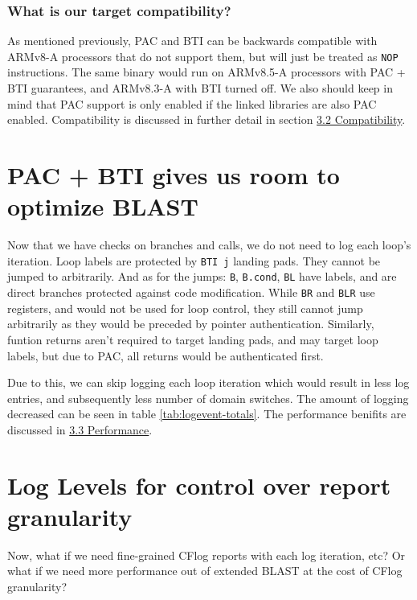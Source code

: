 \documentclass[a4paper, nobind]{templates/ociamthesis}
\begin{document}
\subsubsection{What is our target compatibility?}\label{what-is-our-target-compatibility}

As mentioned previously, PAC and BTI can be backwards compatible with ARMv8-A processors
that do not support them, but will just be treated as \texttt{NOP} instructions.
The same binary would run on ARMv8.5-A processors with PAC + BTI guarantees, and
ARMv8.3-A with BTI turned off.
We also should keep in mind that PAC support is only enabled if the linked libraries
are also PAC enabled.
Compatibility is discussed in further detail in section \hyperref[compatibility]{3.2 Compatibility}.

\section{PAC + BTI gives us room to optimize BLAST}\label{optimizing-blast}

Now that we have checks on branches and calls, we do not need to log each loop's iteration.
Loop labels are protected by \texttt{BTI\ j} landing pads. They cannot be jumped to arbitrarily.
And as for the jumps: \texttt{B}, \texttt{B.cond}, \texttt{BL} have labels, and are direct branches protected
against code modification.
While \texttt{BR} and \texttt{BLR} use registers, and would not be used for loop control,
they still cannot jump arbitrarily as they would be preceded by pointer authentication.
Similarly, funtion returns aren't required to target landing pads, and may target loop labels,
but due to PAC, all returns would be authenticated first.

Due to this, we can skip logging each loop iteration which would result in less
log entries, and subsequently less number of domain switches. The amount of logging
decreased can be seen in table \ref{tab:logevent-totals}.
The performance benifits are discussed in \hyperref[performance]{3.3 Performance}.

\section{Log Levels for control over report granularity}\label{log-levels-for-control-over-report-granularity}

Now, what if we need fine-grained CFlog reports with each log iteration, etc?
Or what if we need more performance out of extended BLAST at the cost of CFlog granularity?
\end{document}
